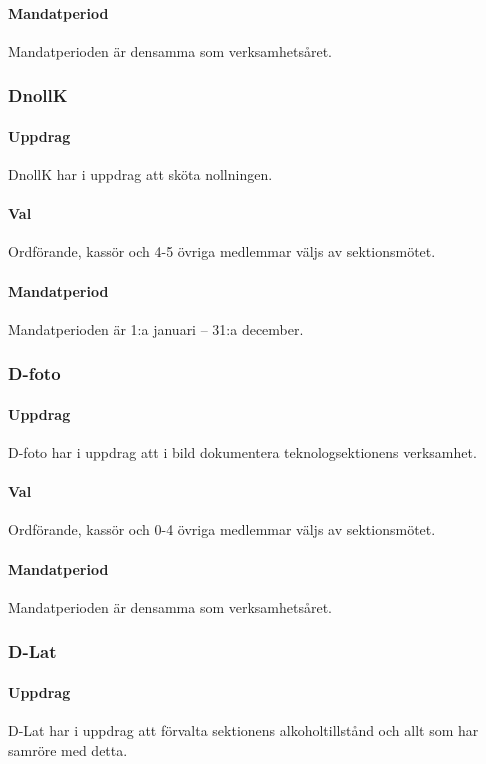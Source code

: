 \documentclass[a4paper, 10pt]{article}
\begin{document}
\paragraph{Mandatperiod\\}
Mandatperioden är densamma som verksamhetsåret. 
\subsubsection{DnollK}
\paragraph{Uppdrag\\}
DnollK har i uppdrag att sköta nollningen. 
\paragraph{Val\\}
Ordförande, kassör och 4-5 övriga medlemmar väljs av sektionsmötet. 
\paragraph{Mandatperiod\\}
Mandatperioden är 1:a januari – 31:a december.
\subsubsection{D-foto}
\paragraph{Uppdrag\\}
D-foto har i uppdrag att i bild dokumentera teknologsektionens verksamhet.
\paragraph{Val\\}
Ordförande, kassör och 0-4 övriga medlemmar väljs av sektionsmötet.
\paragraph{Mandatperiod\\}
Mandatperioden är densamma som verksamhetsåret.
\subsubsection{D-Lat}
\paragraph{Uppdrag\\} 
D-Lat har i uppdrag att förvalta sektionens alkoholtillstånd och allt som har samröre med detta.
\end{document}
